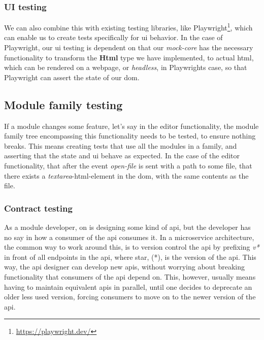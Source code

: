 \subsubsection{UI testing}

We can also combine this with existing testing libraries, like Playwright\footnote{\url{https://playwright.dev/}},
which can enable us to create tests specifically for \gls*{ui} behavior. In the
case of Playwright, our \gls*{ui} testing is dependent on that our
\textit{mock-core} has the necessary functionality to transform the
\textbf{Html} type we have implemented, to actual \gls*{html}, which can be
rendered on a webpage, or \textit{headless}, in Playwrights case, so that
Playwright can assert the state of our \gls*{dom}.


\subsection{Module family testing}

If a module changes some feature, let's say in the editor functionality, the
module family tree encompassing this functionality needs to be tested, to ensure
nothing breaks. This means creating tests that use all the modules in a family,
and asserting that the state and \gls*{ui} behave as expected. In the case of
the editor functionality, that after the event \textit{open-file} is sent with
a path to some file, that there exists a \textit{textarea}-\gls*{html}-element in
the \gls*{dom}, with the same contents as the file.

\subsubsection{Contract testing}

As a module developer, on is designing some kind of \gls*{api}, but the developer
has no say in how a consumer of the \gls*{api} consumes it. In a microservice
architecture, the common way to work around this, is to version control the
\gls*{api} by prefixing \textit{v*} in front of all endpoints in the \gls*{api},
where star, (*), is the version of the \gls*{api}. This way, the \gls*{api}
designer can develop new \gls*{api}s, without worrying about breaking
functionality that consumers of the \gls*{api} depend on. This, however, usually
means having to maintain equivalent \gls*{api}s in parallel, until one decides
to deprecate an older less used version, forcing consumers to move on to the
newer version of the \gls*{api}.

